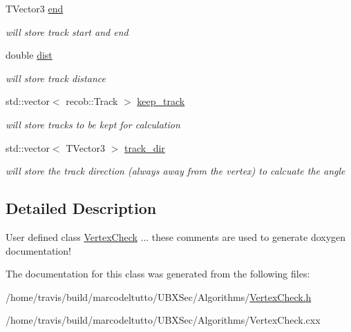 \begin{DoxyCompactItemize}
\item 
\hypertarget{classubxsec_1_1VertexCheck_ad416fe53ee649eb9a9e310e9abe32a0b}{\-T\-Vector3 \hyperlink{classubxsec_1_1VertexCheck_ad416fe53ee649eb9a9e310e9abe32a0b}{end}}\label{classubxsec_1_1VertexCheck_ad416fe53ee649eb9a9e310e9abe32a0b}

\begin{DoxyCompactList}\small\item\em will store track start and end \end{DoxyCompactList}\item 
\hypertarget{classubxsec_1_1VertexCheck_aaa817d271e0bb5e44d07ef5c21ad52cc}{double \hyperlink{classubxsec_1_1VertexCheck_aaa817d271e0bb5e44d07ef5c21ad52cc}{dist}}\label{classubxsec_1_1VertexCheck_aaa817d271e0bb5e44d07ef5c21ad52cc}

\begin{DoxyCompactList}\small\item\em will store track distance \end{DoxyCompactList}\item 
\hypertarget{classubxsec_1_1VertexCheck_a6046f472792f70321896604580b758e6}{std\-::vector$<$ recob\-::\-Track $>$ \hyperlink{classubxsec_1_1VertexCheck_a6046f472792f70321896604580b758e6}{keep\-\_\-track}}\label{classubxsec_1_1VertexCheck_a6046f472792f70321896604580b758e6}

\begin{DoxyCompactList}\small\item\em will store tracks to be kept for calculation \end{DoxyCompactList}\item 
\hypertarget{classubxsec_1_1VertexCheck_a037d7571e3f32aee10ccf100e3a34931}{std\-::vector$<$ \-T\-Vector3 $>$ \hyperlink{classubxsec_1_1VertexCheck_a037d7571e3f32aee10ccf100e3a34931}{track\-\_\-dir}}\label{classubxsec_1_1VertexCheck_a037d7571e3f32aee10ccf100e3a34931}

\begin{DoxyCompactList}\small\item\em will store the track direction (always away from the vertex) to calcuate the angle \end{DoxyCompactList}\end{DoxyCompactItemize}


\subsection{\-Detailed \-Description}
\-User defined class \hyperlink{classubxsec_1_1VertexCheck}{\-Vertex\-Check} ... these comments are used to generate doxygen documentation! 

\-The documentation for this class was generated from the following files\-:\begin{DoxyCompactItemize}
\item 
/home/travis/build/marcodeltutto/\-U\-B\-X\-Sec/\-Algorithms/\hyperlink{VertexCheck_8h}{\-Vertex\-Check.\-h}\item 
/home/travis/build/marcodeltutto/\-U\-B\-X\-Sec/\-Algorithms/\-Vertex\-Check.\-cxx\end{DoxyCompactItemize}

